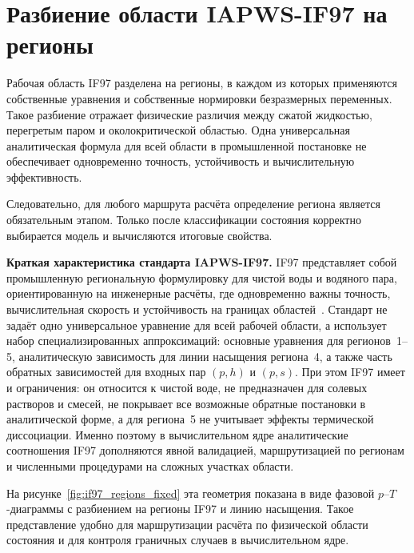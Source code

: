 \section{Разбиение области IAPWS-IF97 на регионы}

Рабочая область IF97 разделена на регионы,
в каждом из которых применяются собственные уравнения
и собственные нормировки безразмерных переменных.
Такое разбиение отражает физические различия
между сжатой жидкостью, перегретым паром и околокритической областью.
Одна универсальная аналитическая формула для всей области
в промышленной постановке не обеспечивает одновременно
точность, устойчивость и вычислительную эффективность.

Следовательно, для любого маршрута расчёта
определение региона является обязательным этапом.
Только после классификации состояния корректно
выбирается модель и вычисляются итоговые свойства.

\textbf{Краткая характеристика стандарта IAPWS-IF97.}
IF97 представляет собой промышленную региональную формулировку
для чистой воды и водяного пара,
ориентированную на инженерные расчёты,
где одновременно важны точность,
вычислительная скорость
и устойчивость на границах областей~\cite{iapws_if97_2012}.
Стандарт не задаёт одно универсальное уравнение
	для всей рабочей области,
	а использует набор специализированных аппроксимаций:
	основные уравнения для регионов~1--5,
	аналитическую зависимость для линии насыщения региона~4,
	а также часть обратных зависимостей для входных пар
	$(p, h)$ и $(p, s)$.
При этом IF97 имеет и ограничения:
он относится к чистой воде,
	не предназначен для солевых растворов и смесей,
	не покрывает все возможные обратные постановки
	в аналитической форме,
	а для региона~5 не учитывает эффекты термической диссоциации.
Именно поэтому в вычислительном ядре
аналитические соотношения IF97
дополняются явной валидацией,
маршрутизацией по регионам
и численными процедурами на сложных участках области.

\par
На рисунке~\ref{fig:if97_regions_fixed} эта геометрия показана в виде фазовой $p$--$T$-диаграммы
с разбиением на регионы IF97 и линию насыщения.
Такое представление удобно для маршрутизации расчёта по физической области состояния
и для контроля граничных случаев в вычислительном ядре.

